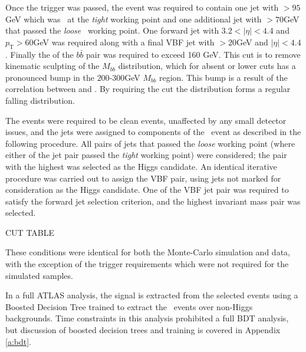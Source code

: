 		Once the trigger was passed, the event was required to contain one jet with \pt$>95$GeV which was \btagged\, at the \textit{tight} working point and one additional jet with \pt$>70$GeV that passed the \textit{loose} \btag\, working point. One forward jet with $3.2 < |\eta| < 4.4$ and $p_{\text{T}}>60$GeV was required along with a final VBF jet with \pt$>20$GeV and $|\eta| < 4.4$. Finally the \pt of the $b\bar{b}$ pair was required to exceed 160 GeV. This cut is to remove kinematic sculpting of the $M_{bb}$ distribution, which for absent or lower \ptbb cuts has a pronounced bump in the $200$-$300$GeV $M_{bb}$ region. This bump is a result of the correlation between \mbb and \ptbb. By requiring the \ptbb cut the \mbb distribution forms a regular falling distribution.

		The events were required to be clean events, unaffected by any small detector issues, and the jets were assigned to components of the \VBFHBB\, event as described in the following procedure. All pairs of jets that passed the \textit{loose} working point (where either of the jet pair passed the \textit{tight} working point) were considered; the pair with the highest \ptbb was selected as the Higgs candidate. An identical iterative procedure was carried out to assign the VBF pair, using jets not marked for consideration as the Higgs candidate. One of the VBF jet pair was required to satisfy the forward jet selection criterion, and the highest invariant mass pair was selected.

		CUT TABLE

		These conditions were identical for both the Monte-Carlo simulation and data, with the exception of the trigger requirements which were not required for the simulated samples.

		In a full ATLAS analysis\cite{VBFHbb8tev}, the signal is extracted from the selected events using a Boosted Decision Tree trained to extract the \VBFHBB\, events over non-Higgs backgrounds. Time constraints in this analysis prohibited a full BDT analysis, but discussion of boosted decision trees and training is covered in Appendix \ref{a:bdt}.


\endinput
